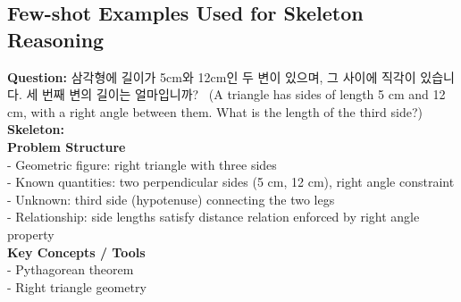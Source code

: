 \subsection{Few-shot Examples Used for Skeleton Reasoning}
\label{sec:few-shots}

\begin{tcolorbox}[
  colback=blue!3,
  colframe=blue!50!black,
  boxrule=0.5pt,
  arc=4pt,
  left=6pt,
  right=6pt,
  top=4pt,
  bottom=4pt,
  title=Skeleton Few-shot Example 1~(Korean)
]
\small
\textbf{Question:} 삼각형에 길이가 5cm와 12cm인 두 변이 있으며, 그 사이에 직각이 있습니다. 세 번째 변의 길이는 얼마입니까?~
(A triangle has sides of length 5 cm and 12 cm, with a right angle between them. What is the length of the third side?)\\[0.5em]

\textbf{Skeleton:}\\
\textbf{Problem Structure}\\
- Geometric figure: right triangle with three sides\\
- Known quantities: two perpendicular sides (5 cm, 12 cm), right angle constraint\\
- Unknown: third side (hypotenuse) connecting the two legs\\
- Relationship: side lengths satisfy distance relation enforced by right angle property\\[0.3em]
\textbf{Key Concepts / Tools}\\
- Pythagorean theorem\\
- Right triangle geometry
\end{tcolorbox}

